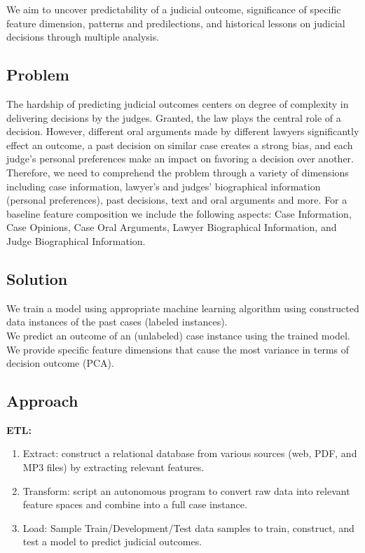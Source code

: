 \documentclass{article} %
\begin{document}
We aim to uncover predictability of a judicial outcome, significance of specific feature dimension, patterns and predilections, and historical lessons on judicial decisions through multiple analysis.

\subsection{Problem}
The hardship of predicting judicial outcomes centers on degree of complexity in delivering decisions by the judges. Granted, the law plays the central role of a decision. However, different oral arguments made by different lawyers significantly effect an outcome, a past decision on similar case creates a strong bias, and each judge's personal preferences make an impact on favoring a decision over another. Therefore, we need to comprehend the problem through a variety of dimensions including case information, lawyer's and judges' biographical information (personal preferences), past decisions, text and oral arguments and more. For a baseline feature composition we include the following aspects: Case Information, Case Opinions, Case Oral Arguments, Lawyer Biographical Information, and Judge Biographical Information.

\subsection{Solution}
We train a model using appropriate machine learning algorithm using constructed data instances of the past cases (labeled instances).\\

We predict an outcome of an (unlabeled) case instance using the trained model.\\

We provide specific feature dimensions that cause the most variance in terms of decision outcome (PCA).\\

\subsection{Approach}

\textbf{ETL:}
\begin{enumerate}

\item Extract: construct a relational database from various sources (web, PDF, and MP3 files) by extracting relevant features.\\

\item Transform: script an autonomous program to convert raw data into relevant feature spaces and combine into a full case instance.\\

\item Load: Sample Train/Development/Test data samples to train, construct, and test a model to predict judicial outcomes.\\
\end{enumerate}
\end{document}
